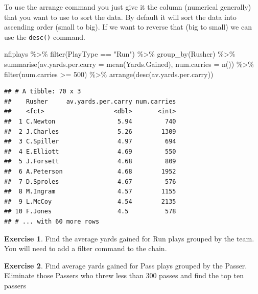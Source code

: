 \documentclass[
]{book}
\newenvironment{Shaded}{\begin{snugshade}}{\end{snugshade}}
\newcommand{\AttributeTok}[1]{\textcolor[rgb]{0.77,0.63,0.00}{#1}}
\newcommand{\DecValTok}[1]{\textcolor[rgb]{0.00,0.00,0.81}{#1}}
\newcommand{\FunctionTok}[1]{\textcolor[rgb]{0.00,0.00,0.00}{#1}}
\newcommand{\NormalTok}[1]{#1}
\newcommand{\SpecialCharTok}[1]{\textcolor[rgb]{0.00,0.00,0.00}{#1}}
\newcommand{\StringTok}[1]{\textcolor[rgb]{0.31,0.60,0.02}{#1}}
\theoremstyle{definition}
\theoremstyle{definition}
\theoremstyle{definition}
\newtheorem{exercise}{Exercise}[chapter]
\theoremstyle{definition}
\theoremstyle{remark}
\begin{document}
To use the arrange command you just give it the column (numerical generally) that you want to use to sort the data. By default it will sort the data into ascending order (small to big). If we want to reverse that (big to small) we can use the \texttt{desc()} command.

\begin{Shaded}
\begin{Highlighting}[]
\NormalTok{nflplays }\SpecialCharTok{\%\textgreater{}\%}
    \FunctionTok{filter}\NormalTok{(PlayType }\SpecialCharTok{==} \StringTok{"Run"}\NormalTok{) }\SpecialCharTok{\%\textgreater{}\%}
    \FunctionTok{group\_by}\NormalTok{(Rusher) }\SpecialCharTok{\%\textgreater{}\%}
    \FunctionTok{summarise}\NormalTok{(}\AttributeTok{av.yards.per.carry =} \FunctionTok{mean}\NormalTok{(Yards.Gained), }\AttributeTok{num.carries =} \FunctionTok{n}\NormalTok{()) }\SpecialCharTok{\%\textgreater{}\%}
    \FunctionTok{filter}\NormalTok{(num.carries }\SpecialCharTok{\textgreater{}=} \DecValTok{500}\NormalTok{) }\SpecialCharTok{\%\textgreater{}\%}
    \FunctionTok{arrange}\NormalTok{(}\FunctionTok{desc}\NormalTok{(av.yards.per.carry))}
\end{Highlighting}
\end{Shaded}

\begin{verbatim}
## # A tibble: 70 x 3
##    Rusher     av.yards.per.carry num.carries
##    <fct>                   <dbl>       <int>
##  1 C.Newton                 5.94         740
##  2 J.Charles                5.26        1309
##  3 C.Spiller                4.97         694
##  4 E.Elliott                4.69         550
##  5 J.Forsett                4.68         809
##  6 A.Peterson               4.68        1952
##  7 D.Sproles                4.67         576
##  8 M.Ingram                 4.57        1155
##  9 L.McCoy                  4.54        2135
## 10 F.Jones                  4.5          578
## # ... with 60 more rows
\end{verbatim}

\begin{exercise}
\protect\hypertarget{exr:unnamed-chunk-170}{}\label{exr:unnamed-chunk-170}Find the average yards gained for Run plays grouped by the team. You will need to add a filter command to the chain.
\end{exercise}

\begin{exercise}
\protect\hypertarget{exr:unnamed-chunk-171}{}\label{exr:unnamed-chunk-171}Find average yards gained for Pass plays grouped by the Passer. Eliminate those Passers who threw less than 300 passes and find the top ten passers
\end{exercise}
\end{document}
